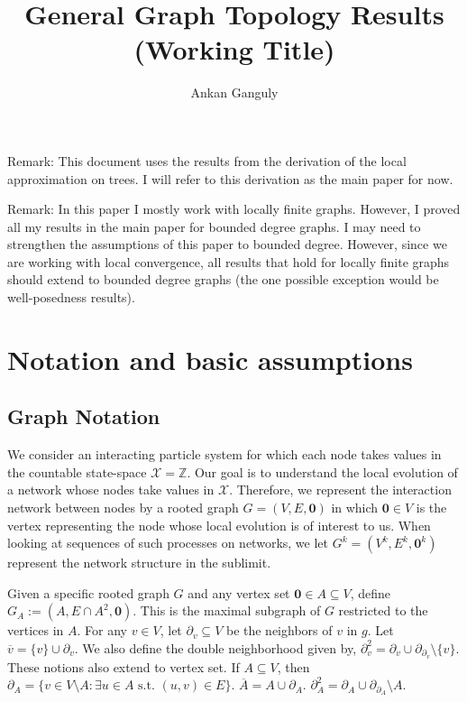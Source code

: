 \documentclass[12pt]{article}
\newcommand{\skipLine}{\vspace{12pt}}
\newcommand{\mb}{\mathbb}
\newcommand{\mc}{\mathcal}
\newcommand{\ov}{\overline}
\newcommand{\te}{\text}
\newcommand{\ind}{\hspace{24pt}}
\newcommand{\defeq}{:=}								%
\newcommand{\sta}{\mc{X}}							%
\newcommand{\neigh}[1]{\partial_{#1}}				%
\newcommand{\dneigh}[1]{\partial^2_{#1}}			%
\newcommand{\cl}[1]{\ov{#1}}						%
\renewcommand{\root}{\mathbf{0}}
\newcommand{\indx}[1]{^{#1}}						%
\newcommand{\subg}[1]{_{#1}}						%
\begin{document}
\title{General Graph Topology Results (Working Title)}
\author{Ankan Ganguly}

\maketitle

Remark: This document uses the results from the derivation of the local approximation on trees. I will refer to this derivation as the main paper for now.

\skipLine

Remark: In this paper I mostly work with locally finite graphs. However, I proved all my results in the main paper for bounded degree graphs. I may need to strengthen the assumptions of this paper to bounded degree. However, since we are working with local convergence, all results that hold for locally finite graphs should extend to bounded degree graphs (the one possible exception would be well-posedness results).

\section{Notation and basic assumptions}
\label{not}

\subsection{Graph Notation}
\label{g::not}

We consider an interacting particle system for which each node takes values in the countable state-space \(\sta = \mb{Z}\). Our goal is to understand the local evolution of a network whose nodes take values in \(\sta\). Therefore, we represent the interaction network between nodes by a rooted graph \(G = (V,E,\root)\) in which \(\root \in V\) is the vertex representing the node whose local evolution is of interest to us. When looking at sequences of such processes on networks, we let \(G\indx{k} = (V\indx{k},E\indx{k},\root\indx{k})\) represent the network structure in the sublimit.

\ind Given a specific rooted graph \(G\) and any vertex set \(\root \in A \subseteq V\), define \(G\subg{A} \defeq (A,E\cap A^2,\root)\). This is the maximal subgraph of \(G\) restricted to the vertices in \(A\). For any \(v \in V\), let \(\neigh{v}\subseteq V\) be the neighbors of \(v\) in \(g\). Let \(\cl{v} = \{v\}\cup\neigh{v}\). We also define the double neighborhood given by, \(\dneigh{v} = \neigh{v} \cup \neigh{\neigh{v}}\setminus \{v\}\). These notions also extend to vertex set. If \(A\subseteq V\), then \(\neigh{A} = \{v \in V\setminus A: \exists u \in A\te{ s.t. } (u,v) \in E\}\). \(\cl{A} = A\cup \neigh{A}\). \(\dneigh{A} = \neigh{A} \cup\neigh{\neigh{A}}\setminus A\).
\end{document}
